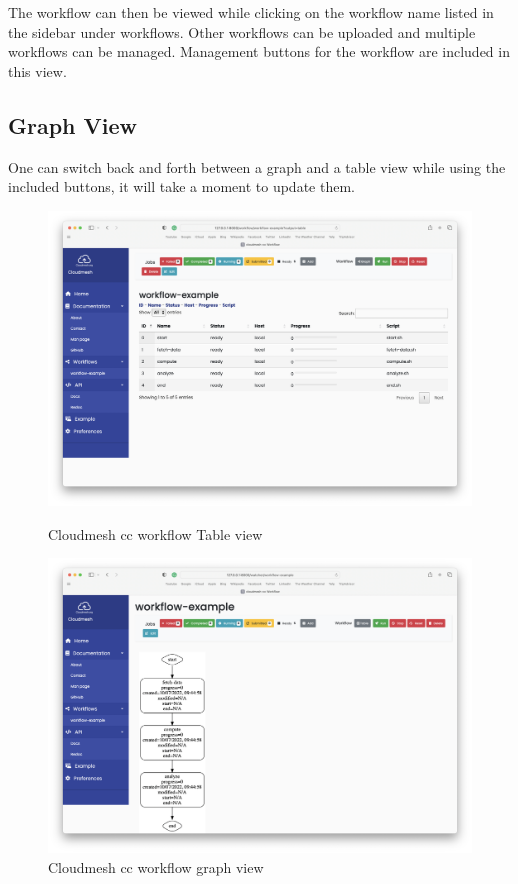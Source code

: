 The workflow can then be viewed while clicking on the workflow name
listed in the sidebar under workflows. Other workflows can be uploaded
and multiple workflows can be managed. Management buttons for the
workflow are included in this view.


\subsection{Graph View}\label{graph-view}

One can switch back and forth between a graph and a table view while
using the included buttons, it will take a moment to update them.

\begin{figure}[htb]
\centering
\includegraphics[width=1.05\columnwidth]{images/service-table.png}
\caption{Cloudmesh cc workflow Table view}

\includegraphics[width=1.05\columnwidth]{images/service-graph.png}
\caption{Cloudmesh cc workflow graph view}
\end{figure}
